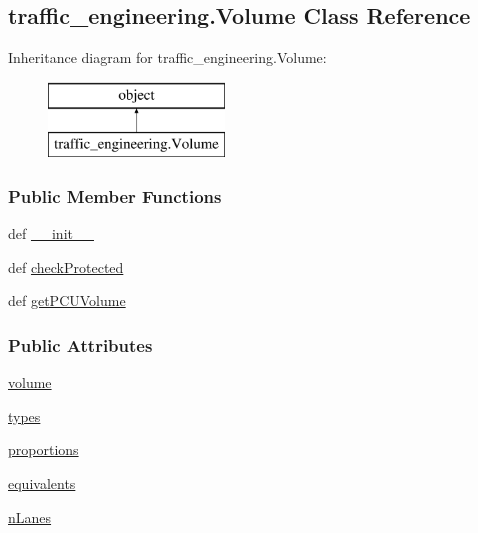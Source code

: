 \hypertarget{classtraffic__engineering_1_1Volume}{\subsection{traffic\-\_\-engineering.\-Volume Class Reference}
\label{classtraffic__engineering_1_1Volume}
}
Inheritance diagram for traffic\-\_\-engineering.\-Volume\-:\begin{figure}[H]
\begin{center}
\leavevmode
\includegraphics[height=2.000000cm]{classtraffic__engineering_1_1Volume}
\end{center}
\end{figure}
\subsubsection*{Public Member Functions}
\begin{DoxyCompactItemize}
\item 
def \hyperlink{classtraffic__engineering_1_1Volume_ad345b04114b018954ff2b079c6912e92}{\-\_\-\-\_\-init\-\_\-\-\_\-}
\item 
def \hyperlink{classtraffic__engineering_1_1Volume_a43e5dd9114ce45dbd07f23ef254bcc73}{check\-Protected}
\item 
def \hyperlink{classtraffic__engineering_1_1Volume_af602b983dcef985e30cfae8e07ee8189}{get\-P\-C\-U\-Volume}
\end{DoxyCompactItemize}
\subsubsection*{Public Attributes}
\begin{DoxyCompactItemize}
\item 
\hyperlink{classtraffic__engineering_1_1Volume_a136564cea8714d5127cdbe077d321181}{volume}
\item 
\hyperlink{classtraffic__engineering_1_1Volume_a80559ccd613b0cd6ec9e606abecb8b87}{types}
\item 
\hyperlink{classtraffic__engineering_1_1Volume_a7b512ba8743bffe101799d4eec54db8f}{proportions}
\item 
\hyperlink{classtraffic__engineering_1_1Volume_a013ff81533ded7ac63a8f0edb9d657b8}{equivalents}
\item 
\hyperlink{classtraffic__engineering_1_1Volume_a217b8d4dd4b4fc2e3dd3d67abf8750f9}{n\-Lanes}
\end{DoxyCompactItemize}


